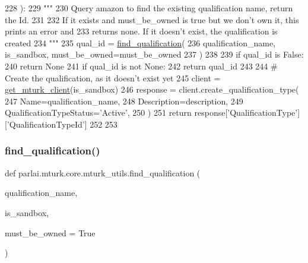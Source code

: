 \begin{DoxyCode}
228 ):
229     \textcolor{stringliteral}{"""}
230 \textcolor{stringliteral}{    Query amazon to find the existing qualification name, return the Id.}
231 \textcolor{stringliteral}{}
232 \textcolor{stringliteral}{    If it exists and must\_be\_owned is true but we don't own it, this prints an error and}
233 \textcolor{stringliteral}{    returns none. If it doesn't exist, the qualification is created}
234 \textcolor{stringliteral}{    """}
235     qual\_id = \hyperlink{namespaceparlai_1_1mturk_1_1core_1_1mturk__utils_a54121023abc81124ba03cc50d5f23af3}{find\_qualification}(
236         qualification\_name, is\_sandbox, must\_be\_owned=must\_be\_owned
237     )
238 
239     \textcolor{keywordflow}{if} qual\_id \textcolor{keywordflow}{is} \textcolor{keyword}{False}:
240         \textcolor{keywordflow}{return} \textcolor{keywordtype}{None}
241     \textcolor{keywordflow}{if} qual\_id \textcolor{keywordflow}{is} \textcolor{keywordflow}{not} \textcolor{keywordtype}{None}:
242         \textcolor{keywordflow}{return} qual\_id
243 
244     \textcolor{comment}{# Create the qualification, as it doesn't exist yet}
245     client = \hyperlink{namespaceparlai_1_1mturk_1_1core_1_1mturk__utils_a577e2527c04682284394b0951a090695}{get\_mturk\_client}(is\_sandbox)
246     response = client.create\_qualification\_type(
247         Name=qualification\_name,
248         Description=description,
249         QualificationTypeStatus=\textcolor{stringliteral}{'Active'},
250     )
251     \textcolor{keywordflow}{return} response[\textcolor{stringliteral}{'QualificationType'}][\textcolor{stringliteral}{'QualificationTypeId'}]
252 
253 
\end{DoxyCode}
\mbox{\label{namespaceparlai_1_1mturk_1_1core_1_1mturk__utils_a54121023abc81124ba03cc50d5f23af3}} 
\subsubsection{\texorpdfstring{find\+\_\+qualification()}{find\_qualification()}}
{\footnotesize\ttfamily def parlai.\+mturk.\+core.\+mturk\+\_\+utils.\+find\+\_\+qualification (\begin{DoxyParamCaption}\item[{}]{qualification\+\_\+name,  }\item[{}]{is\+\_\+sandbox,  }\item[{}]{must\+\_\+be\+\_\+owned = {\ttfamily True} }\end{DoxyParamCaption})}

